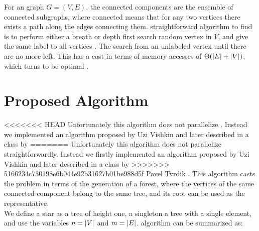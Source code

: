 %

For an  graph $G=(V,E)$, the connected components are the ensemble
of connected subgraphs, where connected means that for any two vertices there exists a path along the edges connecting them.
 straightforward algorithm to find  is to perform either a breath or depth first search  random vertex in $V$, and give the same label to all  vertices .  The search  from an unlabeled vertex
until there are no more  left.
This has a cost in terms of memory accesses of $\Theta(\left| E \right| + \left| V \right|)$, which turns  to be optimal \cite{Hopcroft}.

\section{Proposed Algorithm}\label{sec:yourmethod}
%
%

<<<<<<< HEAD
Unfortunately this algorithm does not parallelize . Instead we  implemented
an algorithm proposed by Uzi Vishkin \cite{PCompPaper} and later described in a class by
=======
Unfortunately this algorithm does not parallelize straightforwardly. Instead we firstly implemented
an algorithm proposed by Uzi Vishkin \cite{PCompArticle} and later described in a class by
>>>>>>> 5166234c730198e6b044e92b31627b01be988d5f
Pavel Tvrdik \cite{PCompClass}. This algorithm casts the problem in terms of the generation of a
forest, where the vertices of the same connected component belong to the same tree, and its root
can be used as the representative.\\
We define a star as a tree of height one, a singleton  a tree with a single element, and use the variables $n=\left| V \right|$ and $m=\left| E \right|$.
 algorithm can be summarized as:

